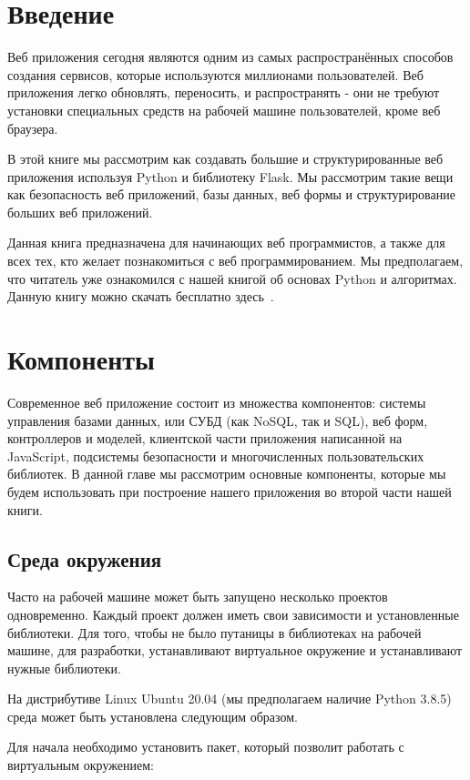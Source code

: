 \chapter*{Введение}
Веб приложения сегодня являются одним из самых распространённых
способов создания сервисов, которые используются миллионами 
пользователей. Веб приложения легко обновлять, переносить, и 
распространять - они не требуют установки специальных средств 
на рабочей машине пользователей, кроме веб браузера.

В этой книге мы рассмотрим как создавать большие и структурированные
веб приложения используя Python и библиотеку Flask. Мы рассмотрим
такие вещи как безопасность веб приложений, базы данных, веб формы
и структурирование больших веб приложений.

Данная книга предназначена для начинающих веб программистов, а также
для всех тех, кто желает познакомиться с веб программированием. Мы предполагаем,
что читатель уже ознакомился с нашей книгой об основах Python и алгоритмах.
Данную книгу можно скачать бесплатно здесь~\cite{kuptsov:python}.

\chapter{Компоненты}

Современное веб приложение состоит из множества компонентов: системы управления
базами данных, или СУБД (как NoSQL, так и SQL), веб форм, контроллеров и моделей,
клиентской части приложения написанной на JavaScript, подсистемы безопасности и 
многочисленных пользовательских библиотек. В данной главе мы рассмотрим основные 
компоненты, которые мы будем использовать при построение нашего приложения во 
второй части нашей книги.

\section{Среда окружения}

Часто на рабочей машине может быть запущено несколько проектов 
одновременно. Каждый проект должен иметь свои зависимости и установленные
библиотеки. Для того, чтобы не было путаницы в библиотеках
на рабочей машине, для разработки, устанавливают виртуальное окружение
и устанавливают нужные библиотеки.

На дистрибутиве Linux Ubuntu 20.04 (мы предполагаем наличие Python 3.8.5)
среда может быть установлена следующим образом.

Для начала необходимо установить пакет, который позволит работать с виртуальным
окружением:

